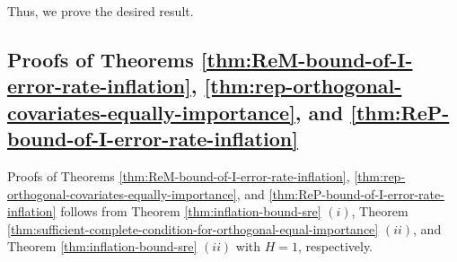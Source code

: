 \documentclass[12pt]{article}
\newcommand{\Lin}{\textnormal{L}}
\newcommand{\Prob}{\mathbb{P}}
\newcommand{\ma}{\mathcal{A}}
\newcommand{\rem}{\textnormal{rem}}
\newcommand{\rep}{\textnormal{rep}}
\newcommand{\bs}{\boldsymbol}
\newcommand{\hpL}{p_\textnormal{L}^{\textnormal{h}}}
\begin{document}
Thus, we prove the desired result.

\subsection{Proofs of Theorems \ref{thm:ReM-bound-of-I-error-rate-inflation}, \ref{thm:rep-orthogonal-covariates-equally-importance}, and \ref{thm:ReP-bound-of-I-error-rate-inflation}} 
Proofs of Theorems \ref{thm:ReM-bound-of-I-error-rate-inflation}, \ref{thm:rep-orthogonal-covariates-equally-importance}, and \ref{thm:ReP-bound-of-I-error-rate-inflation} follows from Theorem \ref{thm:inflation-bound-sre} $(i)$, Theorem \ref{thm:sufficient-complete-condition-for-orthogonal-equal-importance} $(ii)$, and Theorem \ref{thm:inflation-bound-sre} $(ii)$  with $H=1$, respectively.


\end{document}
